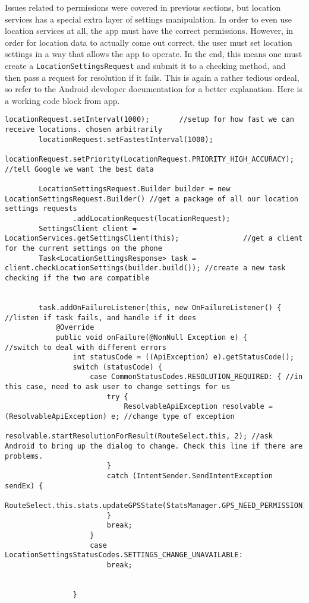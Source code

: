 Issues related to permissions were covered in previous sections, but location services has a special extra layer of settings manipulation. In order to even use location
services at all, the app must have the correct permissions. However, in order for location data to actually come out correct, the user must set location settings in a way
that allows the app to operate. In the end, this means one must create a \verb|LocationSettingsRequest| and submit it to a checking method, and then pass a request for
resolution if it fails. This is again a rather tedious ordeal, so refer to the Android developer documentation for a better explanation.\cite{googleLocationServices}
Here is a working code block from app.
\begin{verbatim}
locationRequest.setInterval(1000);       //setup for how fast we can receive locations. chosen arbitrarily
        locationRequest.setFastestInterval(1000);
        locationRequest.setPriority(LocationRequest.PRIORITY_HIGH_ACCURACY); //tell Google we want the best data

        LocationSettingsRequest.Builder builder = new LocationSettingsRequest.Builder() //get a package of all our location settings requests
                .addLocationRequest(locationRequest);
        SettingsClient client = LocationServices.getSettingsClient(this);               //get a client for the current settings on the phone
        Task<LocationSettingsResponse> task = client.checkLocationSettings(builder.build()); //create a new task checking if the two are compatible


        task.addOnFailureListener(this, new OnFailureListener() { //listen if task fails, and handle if it does
            @Override
            public void onFailure(@NonNull Exception e) {           //switch to deal with different errors
                int statusCode = ((ApiException) e).getStatusCode();
                switch (statusCode) {
                    case CommonStatusCodes.RESOLUTION_REQUIRED: { //in this case, need to ask user to change settings for us
                        try {
                            ResolvableApiException resolvable = (ResolvableApiException) e; //change type of exception
                            resolvable.startResolutionForResult(RouteSelect.this, 2); //ask Android to bring up the dialog to change. Check this line if there are problems.
                        }
                        catch (IntentSender.SendIntentException sendEx) {
                        RouteSelect.this.stats.updateGPSState(StatsManager.GPS_NEED_PERMISSION);
                        }
                        break;
                    }
                    case LocationSettingsStatusCodes.SETTINGS_CHANGE_UNAVAILABLE:
                        break;


                }
\end{verbatim}
